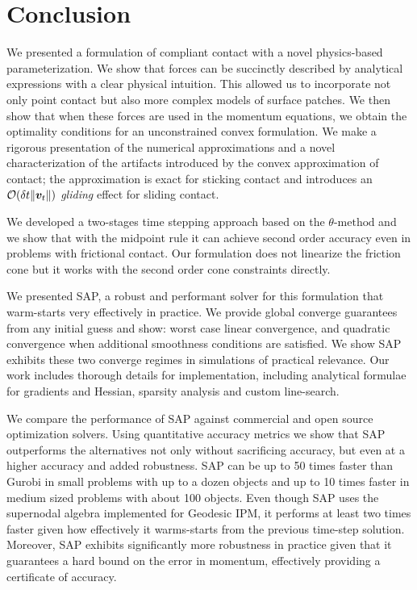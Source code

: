 \section{Conclusion}
\label{sec:future_directions}

We presented a formulation of compliant contact with a novel physics-based
parameterization. We show that forces can be succinctly described by analytical
expressions with a clear physical intuition. This allowed us to incorporate not
only point contact but also more complex models of surface patches. We then show
that when these forces are used in the momentum equations, we obtain the
optimality conditions for an unconstrained convex formulation. We make a
rigorous presentation of the numerical approximations and a novel
characterization of the artifacts introduced by the convex approximation of
contact; the approximation is exact for sticking contact and introduces an
$\mathcal{O}(\delta t\|{\bm{v}}_t\|)$ \emph{gliding} effect for sliding contact.

We developed a two-stages time stepping approach based on the
$\theta\text{-method}$ and we show that with the midpoint rule it can achieve
second order accuracy even in problems with frictional contact. Our formulation
does not linearize the friction cone but it works with the second order cone
constraints directly.

We presented SAP, a robust and performant solver for this formulation that
warm-starts very effectively in practice. We provide global converge guarantees
from any initial guess and show: worst case linear convergence, and quadratic
convergence when additional smoothness conditions are satisfied. We show SAP
exhibits these two converge regimes in simulations of practical relevance. Our
work includes thorough details for implementation, including analytical
formulae for gradients and Hessian, sparsity analysis and custom line-search.

We compare the performance of SAP against commercial and open source
optimization solvers. Using quantitative accuracy metrics we show that SAP
outperforms the alternatives not only without sacrificing accuracy, but even at
a higher accuracy and added robustness. SAP can be up to 50 times faster than
Gurobi in small problems with up to a dozen objects and up to 10 times faster in
medium sized problems with about 100 objects. Even though SAP uses the
supernodal algebra implemented for Geodesic IPM, it performs at least two times
faster given how effectively it warms-starts from the previous time-step
solution. Moreover, SAP exhibits significantly more robustness in practice given
that it guarantees a hard bound on the error in momentum, effectively providing
a certificate of accuracy.

